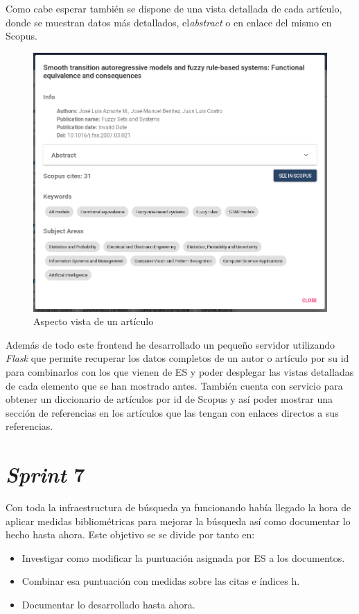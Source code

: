 \newpage

Como cabe esperar también se dispone de una vista detallada de cada artículo, donde se muestran datos más detallados, el\textit{abstract} o en enlace del mismo en Scopus.
\begin{figure}[h]
	
	\centering
	\includegraphics[width=\linewidth]{imagenes/AspectoVistaAbstract}
	\caption{Aspecto vista de un artículo}
\end{figure}

Además de todo este \gls{frontend} he desarrollado un pequeño servidor utilizando \textit{Flask} que permite recuperar los datos completos de un autor o artículo por su id para combinarlos con los que vienen de \acrshort{ES} y poder desplegar las vistas detalladas de cada elemento que se han mostrado antes. También cuenta con servicio para obtener un diccionario de artículos por id de Scopus y así poder mostrar una sección de referencias en los artículos que las tengan con enlaces directos a sus referencias.

\section{\textit{Sprint} 7}
Con toda la infraestructura de búsqueda ya funcionando había llegado la hora de aplicar medidas bibliométricas para mejorar la búsqueda así como documentar lo hecho hasta ahora. Este objetivo se se divide por tanto en:
\begin{itemize}
	\item Investigar como modificar la puntuación asignada por \acrshort{ES} a los documentos.
	\item Combinar esa puntuación con medidas sobre las citas e índices h.
	\item Documentar lo desarrollado hasta ahora.
\end{itemize}

